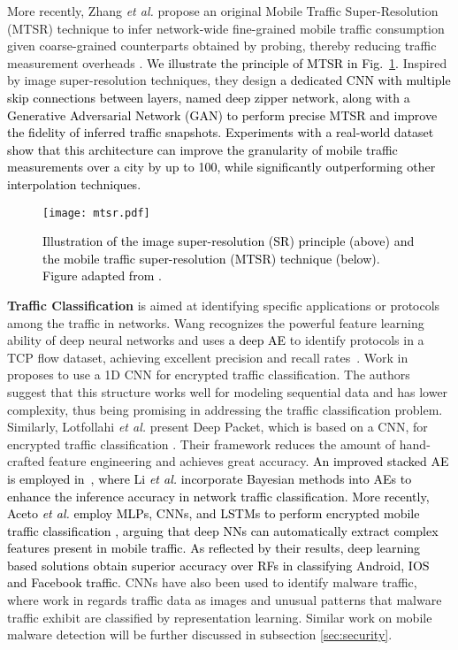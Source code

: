 \documentclass[journal,comsoc,letter]{IEEEtran}
\newcommand{\edit}[1]{\textcolor{black}{#1}}
\newcommand{\rev}[1]{\textcolor{black}{#1}}
\begin{document}
More recently, Zhang \emph{et al.} propose an original Mobile Traffic Super-Resolution (MTSR) technique to infer network-wide fine-grained mobile traffic consumption given coarse-grained counterparts obtained by probing, thereby reducing traffic measurement overheads \cite{chaoyun2017zipnet}. \rev{We illustrate the principle of MTSR in Fig.~\ref{fig:mtsr}.} Inspired by image super-resolution techniques, they design \edit{a dedicated CNN with multiple skip connections between layers, named deep zipper network, along with a Generative Adversarial Network (GAN) to perform precise MTSR and improve the fidelity of inferred traffic snapshots. Experiments with a real-world dataset show that this architecture can improve the granularity of mobile traffic measurements over a city by up to 100, while significantly outperforming other interpolation techniques.}\\
\begin{figure}[htb]
\begin{center}
\texttt{[image: mtsr.pdf]}
\end{center}
\caption{\label{fig:mtsr} \rev{Illustration of the image super-resolution (SR) principle (above) and the mobile traffic super-resolution (MTSR) technique (below). Figure adapted from \cite{chaoyun2017zipnet}.} }
\end{figure}

\noindent \textbf{Traffic Classification}
is aimed at identifying specific applications or protocols among the traffic in networks. Wang recognizes the powerful feature learning ability of deep neural networks and uses \rev{a deep AE} to identify protocols in a TCP flow dataset, achieving excellent precision and recall rates~\cite{wang2015applications}. Work in~\cite{wang2017end} proposes to use a 1D CNN for encrypted traffic classification. The authors suggest that this structure works well for modeling sequential data and has lower complexity, thus being promising in addressing the traffic classification problem. Similarly, Lotfollahi \emph{et al.} present Deep Packet, which is based on a CNN, for encrypted traffic classification \cite{lotfollahi2017deep}. Their framework reduces the amount of hand-crafted feature engineering and achieves great accuracy. \rev{An improved stacked AE is employed in~\cite{8553650}, where Li \emph{et al.} incorporate Bayesian methods into AEs to enhance the inference accuracy in network traffic classification.} \edit{More recently, Aceto \emph{et al.} employ MLPs, CNNs, and LSTMs to perform encrypted mobile traffic classification \cite{aceto2018mobile}, arguing that deep NNs can automatically extract complex features present in mobile traffic. As reflected by their results, deep learning based solutions obtain superior accuracy over RFs in classifying Android, IOS and Facebook traffic.}
CNNs have also been used to identify malware traffic, where work in \cite{wang2017malware} regards traffic data as images and unusual patterns that malware traffic exhibit are classified by representation learning. Similar work on mobile malware detection will be further discussed in subsection \ref{sec:security}. 
\\
\end{document}
